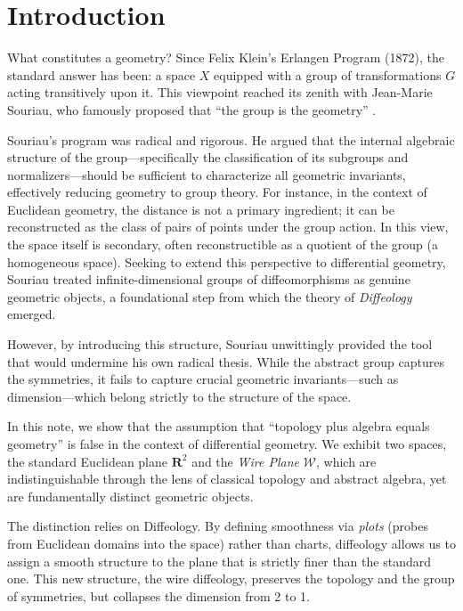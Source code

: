 \documentclass[10pt,letterpaper,reqno]{amsart}
\newcommand{\RR}{\mathbf{R}}
\newcommand{\cW}{\mathcal{W}}
\begin{document}
  
  \section{Introduction}
  
  What constitutes a geometry?
  Since Felix Klein's Erlangen Program (1872),
  the standard answer has been:
  a space $X$ equipped with a group of transformations $G$ acting transitively upon it.
  This viewpoint reached its zenith with Jean-Marie Souriau,
  who famously proposed that ``the group is the geometry'' \cite{Sou84}.
  
  Souriau's program was radical and rigorous.
  He argued that the internal algebraic structure of the group---specifically the classification of its subgroups and normalizers---should be sufficient to characterize all geometric invariants,
  effectively reducing geometry to group theory.
  For instance,
  in the context of Euclidean geometry,
  the distance is not a primary ingredient;
  it can be reconstructed as the class of pairs of points under the group action.
  In this view,
  the space itself is secondary,
  often reconstructible as a quotient of the group (a homogeneous space).
  Seeking to extend this perspective to differential geometry,
  Souriau treated infinite-dimensional groups of diffeomorphisms as genuine geometric objects,
  a foundational step from which the theory of \emph{Diffeology} emerged.
  
  However,
  by introducing this structure,
  Souriau unwittingly provided the tool that would undermine his own radical thesis.
  While the abstract group captures the symmetries,
  it fails to capture crucial geometric invariants---such as dimension---which belong strictly to the structure of the space.
  
  In this note,
  we show that the assumption that ``topology plus algebra equals geometry'' is false in the context of differential geometry.
  We exhibit two spaces,
  the standard Euclidean plane $\RR^2$ and the \emph{Wire Plane} $\cW$,
  which are indistinguishable through the lens of classical topology and abstract algebra,
  yet are fundamentally distinct geometric objects.
  
  The distinction relies on Diffeology.
  By defining smoothness via \emph{plots} (probes from Euclidean domains into the space) rather than charts,
  diffeology allows us to assign a smooth structure to the plane that is strictly finer than the standard one.
  This new structure,
  the wire diffeology,
  preserves the topology and the group of symmetries,
  but collapses the dimension from 2 to 1.
  
\end{document}
